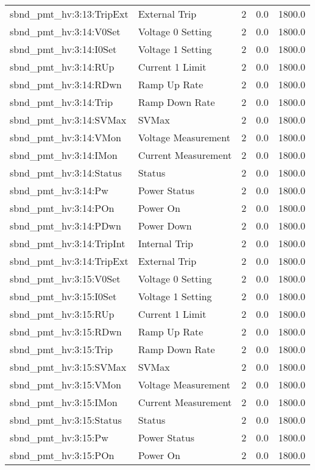 \begin{center}
\begin{longtable}{l | l l l l }
sbnd\_pmt\_hv:3:13:TripExt & External Trip & 2 & 0.0 & 1800.0\\ 
sbnd\_pmt\_hv:3:14:V0Set & Voltage 0 Setting & 2 & 0.0 & 1800.0\\ 
sbnd\_pmt\_hv:3:14:I0Set & Voltage 1 Setting & 2 & 0.0 & 1800.0\\ 
sbnd\_pmt\_hv:3:14:RUp & Current 1 Limit & 2 & 0.0 & 1800.0\\ 
sbnd\_pmt\_hv:3:14:RDwn & Ramp Up Rate & 2 & 0.0 & 1800.0\\ 
sbnd\_pmt\_hv:3:14:Trip & Ramp Down Rate & 2 & 0.0 & 1800.0\\ 
sbnd\_pmt\_hv:3:14:SVMax & SVMax & 2 & 0.0 & 1800.0\\ 
sbnd\_pmt\_hv:3:14:VMon & Voltage Measurement & 2 & 0.0 & 1800.0\\ 
sbnd\_pmt\_hv:3:14:IMon & Current Measurement & 2 & 0.0 & 1800.0\\ 
sbnd\_pmt\_hv:3:14:Status & Status & 2 & 0.0 & 1800.0\\ 
sbnd\_pmt\_hv:3:14:Pw & Power Status & 2 & 0.0 & 1800.0\\ 
sbnd\_pmt\_hv:3:14:POn & Power On & 2 & 0.0 & 1800.0\\ 
sbnd\_pmt\_hv:3:14:PDwn & Power Down & 2 & 0.0 & 1800.0\\ 
sbnd\_pmt\_hv:3:14:TripInt & Internal Trip & 2 & 0.0 & 1800.0\\ 
sbnd\_pmt\_hv:3:14:TripExt & External Trip & 2 & 0.0 & 1800.0\\ 
sbnd\_pmt\_hv:3:15:V0Set & Voltage 0 Setting & 2 & 0.0 & 1800.0\\ 
sbnd\_pmt\_hv:3:15:I0Set & Voltage 1 Setting & 2 & 0.0 & 1800.0\\ 
sbnd\_pmt\_hv:3:15:RUp & Current 1 Limit & 2 & 0.0 & 1800.0\\ 
sbnd\_pmt\_hv:3:15:RDwn & Ramp Up Rate & 2 & 0.0 & 1800.0\\ 
sbnd\_pmt\_hv:3:15:Trip & Ramp Down Rate & 2 & 0.0 & 1800.0\\ 
sbnd\_pmt\_hv:3:15:SVMax & SVMax & 2 & 0.0 & 1800.0\\ 
sbnd\_pmt\_hv:3:15:VMon & Voltage Measurement & 2 & 0.0 & 1800.0\\ 
sbnd\_pmt\_hv:3:15:IMon & Current Measurement & 2 & 0.0 & 1800.0\\ 
sbnd\_pmt\_hv:3:15:Status & Status & 2 & 0.0 & 1800.0\\ 
sbnd\_pmt\_hv:3:15:Pw & Power Status & 2 & 0.0 & 1800.0\\ 
sbnd\_pmt\_hv:3:15:POn & Power On & 2 & 0.0 & 1800.0\\ 

\end{longtable}
\end{center}
